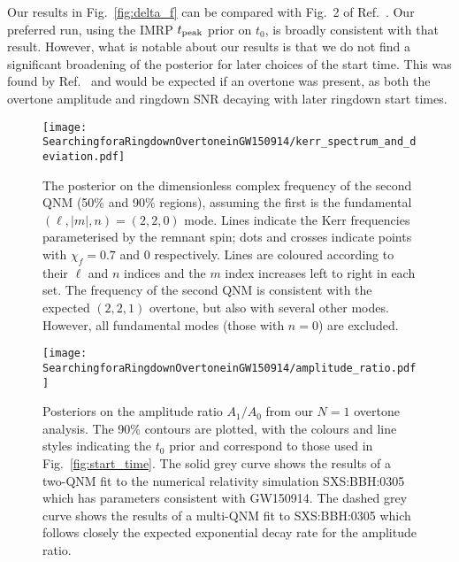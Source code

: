 Our results in Fig.~\ref{fig:delta_f} can be compared with Fig.~2 of Ref.~\cite{Isi:2022mhy}. 
Our preferred run, using the IMRP $t_{\rm peak}$ prior on $t_0$, is broadly consistent with that result.
However, what is notable about our results is that we do not find a significant broadening of the posterior for later choices of the start time. 
This was found by Ref.~\cite{Isi:2022mhy} and would be expected if an overtone was present, as both the overtone amplitude and ringdown SNR decaying with later ringdown start times.

\begin{figure}
    \centering
    \texttt{[image: SearchingforaRingdownOvertoneinGW150914/kerr\_spectrum\_and\_deviation.pdf]}
    \caption[Posterior on the dimensionless complex frequency of the second GW150914 QNM assuming the first is the fundamental mode]{ 
    The posterior on the dimensionless complex frequency of the second QNM (50\% and 90\% regions), assuming the first is the fundamental $(\ell,|m|,n)=(2,2,0)$ mode.
    Lines indicate the Kerr frequencies parameterised by the remnant spin; dots and crosses indicate points with $\chi_f=0.7$ and $0$ respectively.
    Lines are coloured according to their $\ell$ and $n$ indices and the $m$ index increases left to right in each set.
    The frequency of the second QNM is consistent with the expected $(2,2,1)$ overtone, but also with several other modes.
    However, all fundamental modes (those with $n=0$) are excluded.
    }
    \label{fig:other_QNMs}
\end{figure}

\begin{figure}[t]
    \centering
    \texttt{[image: SearchingforaRingdownOvertoneinGW150914/amplitude\_ratio.pdf]}
    \caption[Posteriors on the amplitude ratio $A_1/A_0$ from the GW150914 overtone analysis]{ 
    Posteriors on the amplitude ratio $A_1/A_0$ from our $N=1$ overtone analysis. 
    The 90\% contours are plotted, with the colours and line styles indicating the $t_0$ prior and correspond to those used in Fig.~\ref{fig:start_time}.
    The solid grey curve shows the results of a two-QNM fit to the numerical relativity simulation SXS:BBH:0305 which has parameters consistent with GW150914.
    The dashed grey curve shows the results of a multi-QNM fit to SXS:BBH:0305 which follows closely the expected exponential decay rate for the amplitude ratio.
    }
    \label{fig:amp_ratio}
\end{figure}

